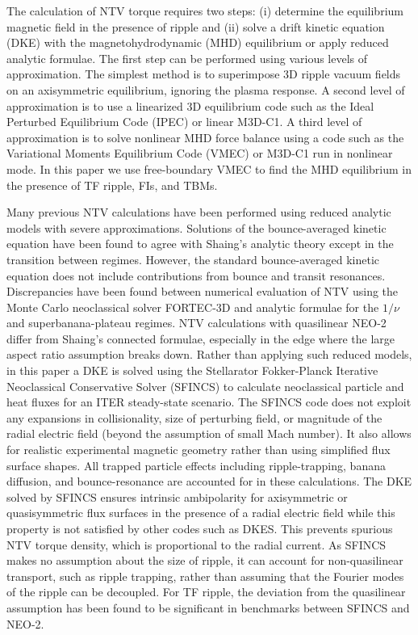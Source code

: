 \documentclass[aip, pop, preprint]{revtex4-1}
\begin{document}
The calculation of NTV torque requires two steps: (i) determine the equilibrium magnetic field in the presence of ripple and (ii) solve a drift kinetic equation (DKE) with the magnetohydrodynamic (MHD) equilibrium or apply reduced analytic formulae. The first step can be performed using various levels of approximation. The simplest method is to superimpose 3D ripple vacuum fields on an axisymmetric equilibrium, ignoring the plasma response.  A second level of approximation is to use a linearized 3D equilibrium code such as the Ideal Perturbed Equilibrium Code (IPEC) \cite{Park2009} or linear M3D-C1.\cite{Jardin2008} A third level of approximation is to solve nonlinear MHD force balance using a code such as the Variational Moments Equilibrium Code (VMEC) \cite{Hirshman1986a} or M3D-C1 \cite{Ferraro2010} run in nonlinear mode. In this paper we use free-boundary VMEC to find the MHD equilibrium in the presence of TF ripple, FIs, and TBMs. 

Many previous NTV calculations \cite{Zhu2006,Hua2010,Cole2011,Park2009} have been performed using reduced analytic models with severe approximations. Solutions of the bounce-averaged kinetic equation have been found to agree with Shaing's analytic theory except in the transition between regimes.\cite{Sun2010} However, the standard bounce-averaged kinetic equation does not include contributions from bounce and transit resonances. Discrepancies have been found between numerical evaluation of NTV using the Monte Carlo neoclassical solver FORTEC-3D and analytic formulae for the $1/\nu$ and superbanana-plateau regimes.\cite{Satake2011a,Satake2011b} NTV calculations with quasilinear NEO-2 differ from Shaing's connected formulae,\cite{Shaing2010} especially in the edge where the large aspect ratio assumption breaks down.\cite{Martitsch2016} Rather than applying such reduced models, in this paper a DKE is solved using the Stellarator Fokker-Planck Iterative Neoclassical Conservative Solver (SFINCS) \cite{Landreman2014} to calculate neoclassical particle and heat fluxes for an ITER steady-state scenario. The SFINCS code does not exploit any expansions in collisionality, size of perturbing field, or magnitude of the radial electric field (beyond the assumption of small Mach number). It also allows for realistic experimental magnetic geometry rather than using simplified flux surface shapes. All trapped particle effects including ripple-trapping,\cite{Stringer1972} banana diffusion,\cite{Linsker1982} and bounce-resonance\cite{Linsker1982} are accounted for in these calculations. The DKE solved by SFINCS ensures intrinsic ambipolarity for axisymmetric or quasisymmetric flux surfaces in the presence of a radial electric field while this property is not satisfied by other codes such as DKES.\cite{Hirshman1986b,Rij1989} This prevents spurious NTV torque density, which is proportional to the radial current. As SFINCS makes no assumption about the size of ripple, it can account for non-quasilinear transport, such as ripple trapping, rather than assuming that the Fourier modes of the ripple can be decoupled. For TF ripple, the deviation from the quasilinear assumption has been found to be significant in benchmarks between SFINCS and NEO-2.\cite{Martitsch2016}
\end{document}
